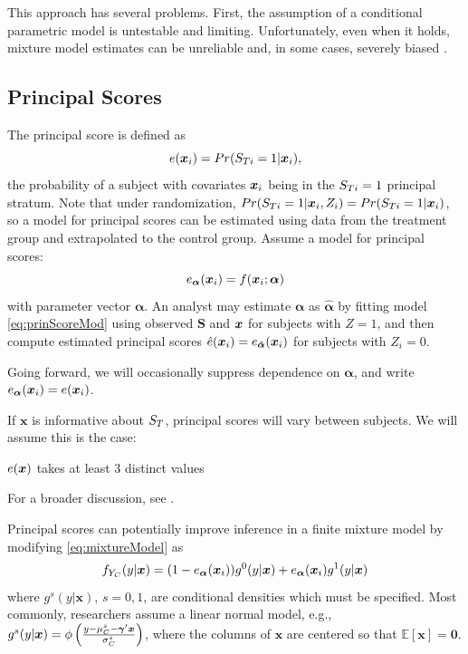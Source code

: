 \documentclass[]{article}
\begin{document}
This approach has several problems.
First, the assumption of a conditional parametric model is untestable and limiting.
Unfortunately, even when it holds, mixture model estimates can be unreliable and, in some cases, severely biased \citep{griffin2008application,feller2017principal}.

\subsection{Principal Scores}
The principal score \citep[e.g.][]{jo} is defined as
\begin{equation}\label{eq:pscore}
  e(\bm{x}_i)=Pr(S_{Ti}=1|\bm{x}_i),
\end{equation}
the probability of a subject with covariates $\bm{x}_i$ being in the $S_{Ti}=1$ principal stratum.
Note that under randomization, $Pr(S_{Ti}=1|\bm{x}_i,Z_i)=Pr(S_{Ti}=1|\bm{x}_i)$, so a model for principal scores can be estimated using data from the treatment group and extrapolated to the control group.
Assume a model for principal scores:
\begin{equation}\label{eq:prinScoreMod}
  e_{\bm{\alpha}}(\bm{x}_i)=f(\bm{x}_i;\bm{\alpha})
\end{equation}
with parameter vector $\bm{\alpha}$. An analyst may estimate $\bm{\alpha}$ as $\bm{\hat{\alpha}}$ by fitting model \eqref{eq:prinScoreMod} using observed $\bm{S}$ and $\bm{x}$ for subjects with $Z=1$, and then compute estimated principal scores $\hat{e}(\bm{x}_i)=e_{\bm{\hat{\alpha}}}(\bm{x}_i)$ for subjects with $Z_i=0$.

Going forward, we will occasionally suppress dependence on $\bm{\alpha}$, and write $e_{\bm{\alpha}}(\bm{x}_i)=e(\bm{x}_i)$.

If $\bm{x}$ is informative about $S_T$, principal scores will vary between subjects. We will assume this is the case: %
\begin{ass}\label{ass:vps}
 $e(\bm{x})$ takes at least 3 distinct values
\end{ass}
For a broader discussion, see \citet{ding2011,jiangDing2021}.

Principal scores can potentially improve inference in a finite mixture model by modifying \eqref{eq:mixtureModel} as
\begin{equation}\label{eq:mixtureModelPS}
  f_{Y_C}(y|\bm{x})=(1-\ppip{\bm{\alpha}})%
g^0(y|\bm{x})+\ppip{\bm{\alpha}}%
g^1(y|\bm{x})
\end{equation}
where $g^s(y|\bm{x})$, $s=0,1$, are conditional densities which must be specified. Most commonly, researchers assume a linear normal model, e.g., $g^s(y|\bm{x})=\phi\left(\frac{y-\mu_C^s-\bm{\gamma}'\bm{x}}{\sigma_C^s}\right)$, where the columns of $\bm{x}$ are centered so that $\mathbb{E}[\bm{x}]=\bm{0}$. 
\end{document}
